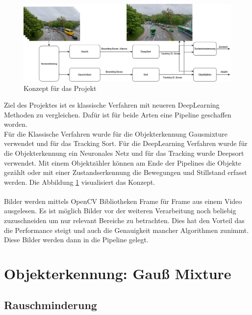 \documentclass[conference]{IEEEtran}
\begin{document}
	\begin{figure}[!h]
		\begin{center}
			\includegraphics[width=14cm]{Media/KonzeptVAOT.png}
			\caption{Konzept für das Projekt}
			\label{Konzept}
		\end{center}
	\end{figure}
	Ziel des Projektes ist es klassische Verfahren mit neueren DeepLearning Methoden zu vergleichen.
	Dafür ist für beide Arten eine Pipeline geschaffen worden.\\
	Für die Klassische Verfahren wurde für die Objekterkennung Gausmixture verwendet und für das Tracking Sort. Für die DeepLearning Verfahren wurde für die Objekterkennung ein Neuronales Netz  und für das Tracking wurde Deepsort verwendet. Mit einem Objektzähler können am Ende der Pipelines die Objekte gezählt oder mit einer Zustandserkennung die Bewegungen und Stillstand erfasst werden. Die Abbildung \ref{Konzept} visualisiert das Konzept.\\
	\\
	Bilder werden mittels OpenCV Bibliotheken Frame für Frame aus einem Video ausgelesen.
	Es ist möglich Bilder vor der weiteren Verarbeitung noch beliebig zuzuschneiden um nur relevant Bereiche zu betrachten. Dies hat den Vorteil das die Performance steigt und auch die Genauigkeit mancher Algorithmen zunimmt. Diese Bilder werden dann in die Pipeline gelegt.
	
	\section{Objekterkennung: Gauß Mixture}
	
	\subsection{Rauschminderung}
	
\end{document}
